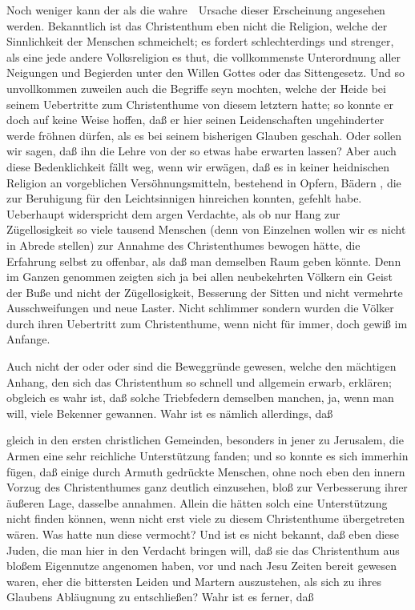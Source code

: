 \begin{aufza}
\item Noch weniger kann der  als die wahre~\ Ursache dieser Erscheinung angesehen werden. Bekanntlich ist das Christenthum eben nicht die Religion, welche der Sinnlichkeit der Menschen schmeichelt; es fordert schlechterdings und strenger, als eine jede andere Volksreligion es thut, die vollkommenste Unterordnung aller Neigungen und Begierden unter den Willen Gottes oder das Sittengesetz. Und so unvollkommen zuweilen auch die Begriffe seyn mochten, welche der Heide bei seinem Uebertritte zum Christenthume von diesem letztern hatte; so konnte er doch auf keine Weise hoffen, daß er hier seinen Leidenschaften ungehinderter werde fröhnen dürfen, als es bei seinem bisherigen Glauben geschah. Oder sollen wir sagen, daß ihn die  Lehre von der  so etwas habe erwarten lassen? Aber auch diese Bedenklichkeit fällt weg, wenn wir erwägen, daß es in keiner heidnischen Religion an vorgeblichen Versöhnungsmitteln, bestehend in Opfern, Bädern \udgl , die zur Beruhigung für den Leichtsinnigen hinreichen konnten, gefehlt habe. Ueberhaupt widerspricht dem argen Verdachte, als ob nur Hang zur Zügellosigkeit so viele tausend Menschen (denn von Einzelnen wollen wir es nicht in Abrede stellen) zur Annahme des Christenthumes bewogen hätte, die Erfahrung selbst zu offenbar, als daß man demselben Raum geben könnte. Denn im Ganzen genommen zeigten sich ja bei allen neubekehrten Völkern ein Geist der Buße und nicht der Zügellosigkeit, Besserung der Sitten und nicht vermehrte Ausschweifungen und neue Laster. Nicht schlimmer sondern  wurden die Völker durch ihren Uebertritt zum Christenthume, wenn nicht für immer, doch gewiß im Anfange.
\item Auch nicht der  oder  oder  sind die Beweggründe gewesen, welche den mächtigen Anhang, den sich das Christenthum so schnell und allgemein erwarb, erklären; obgleich es wahr ist, daß solche Triebfedern demselben manchen, ja, wenn man will, viele Bekenner gewannen. Wahr ist es nämlich allerdings, daß
\begin{aufzb}
\item gleich in den ersten christlichen Gemeinden, besonders in jener zu Jerusalem, die Armen eine sehr reichliche Unterstützung fanden; und so konnte es sich immerhin fügen, daß einige durch Armuth gedrückte Menschen, ohne noch eben den innern Vorzug des Christenthumes ganz deutlich einzusehen, bloß zur Verbesserung ihrer äußeren Lage, dasselbe annahmen. Allein die  hätten solch eine Unterstützung nicht finden können, wenn nicht erst viele  zu diesem Christenthume übergetreten wären. Was hatte nun diese vermocht? Und ist es nicht bekannt, daß eben diese Juden, die man hier in den Verdacht bringen will, daß sie das Christenthum aus bloßem Eigennutze angenomen haben, vor und nach Jesu Zeiten bereit gewesen waren, eher die bittersten Leiden und Martern auszustehen, als sich zu ihres Glaubens Abläugnung zu entschließen? Wahr ist es ferner, daß

\end{aufzb}
\end{aufza}
